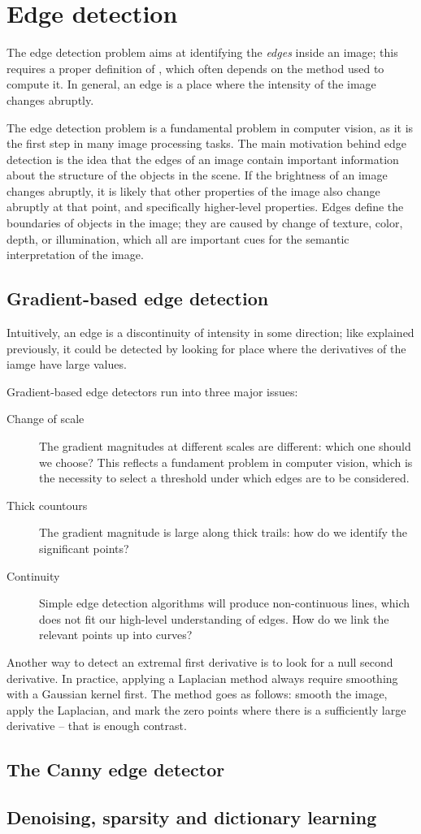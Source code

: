 \section{Edge detection}
The edge detection problem aims at identifying the \emph{edges} inside an image; this requires a proper definition of , which often depends on the method used to compute it. In general, an edge is a place where the intensity of the image changes abruptly. 

The edge detection problem is a fundamental problem in computer vision, as it is the first step in many image processing tasks. The main motivation behind edge detection is the idea that the edges of an image contain important information about the structure of the objects in the scene. If the brightness of an image changes abruptly, it is likely that other properties of the image also change abruptly at that point, and specifically higher-level properties. Edges define the boundaries of objects in the image; they are caused by change of texture, color, depth, or illumination, which all are important cues for the semantic interpretation of the image.

\subsection{Gradient-based edge detection}
Intuitively, an edge is a discontinuity of intensity in some direction; like explained previously, it could be detected by looking for place where the derivatives of the iamge have large values.

Gradient-based edge detectors run into three major issues:
\begin{description}
    \item[Change of scale] The gradient magnitudes at different scales are different: which one should we choose? This reflects a fundament problem in computer vision, which is the necessity to select a threshold under which edges are  to be considered.
    \item[Thick countours] The gradient magnitude is large along thick trails: how do we identify the significant points?
    \item[Continuity] Simple edge detection algorithms will produce non-continuous lines, which does not fit our high-level understanding of edges. How do we link the relevant points up into curves?
\end{description}

Another way to detect an extremal first derivative is to look for a null second derivative. In practice, applying a Laplacian method always require smoothing with a Gaussian kernel first. The method goes as follows: smooth the image, apply the Laplacian, and mark the zero points where there is a sufficiently large derivative -- that is enough contrast.

\subsection{The Canny edge detector}

\subsection{Denoising, sparsity and dictionary learning}